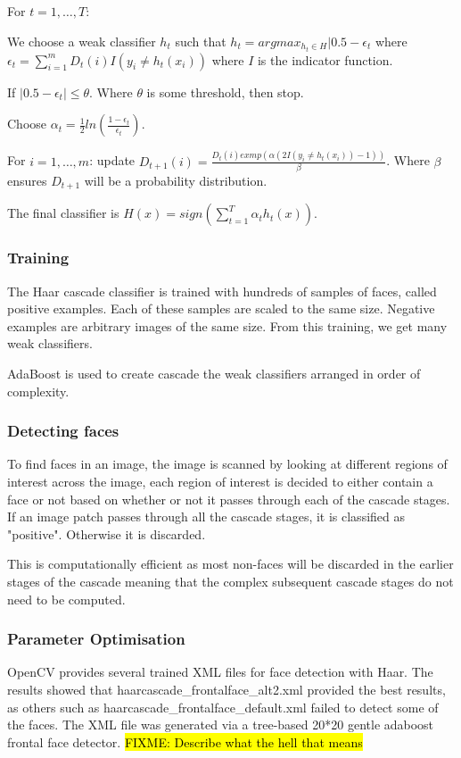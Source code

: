 \documentclass{article}
\begin{document}
\noindent For $t=1,\ldots,T$:

We choose a weak classifier $h_t$ such that $h_t = argmax_{h_t\in H}|0.5 - \epsilon_t$ where $\epsilon_t = \sum_{i=1}^m D_t(i)I(y_i\ne h_t(x_i))$ where $I$ is the indicator function.

If $|0.5 - \epsilon_t| \le \theta$. Where $\theta$ is some threshold, then stop.

Choose $\alpha_t=\frac{1}{2}ln(\frac{1-\epsilon_t}{\epsilon_t})$.

For $i=1,\ldots,m$: update $D_{t+1}(i)=\frac{D_t(i)exmp(\alpha(2I(y_i\ne h_t(x_i))-1))}{\beta}$. Where $\beta$ ensures $D_{t+1}$ will be a probability distribution.

The final classifier is $H(x)=sign(\sum_{t=1}^T\alpha_th_t(x))$.



\subsubsection{Training}
The Haar cascade classifier is trained with hundreds of samples of faces, called positive examples. Each of these samples are scaled to the same size. Negative examples are arbitrary images of the same size. From this training, we get many weak classifiers.

AdaBoost is used to create cascade the weak classifiers arranged in order of complexity.

\subsubsection{Detecting faces}
To find faces in an image, the image is scanned by looking at different regions of interest across the image, each region of interest is decided to either contain a face or not based on whether or not it passes through each of the cascade stages. If an image patch passes through all the cascade stages, it is classified as "positive". Otherwise it is discarded.

This is computationally efficient as most non-faces will be discarded in the earlier stages of the cascade meaning that the complex subsequent cascade stages do not need to be computed.

\subsubsection{Parameter Optimisation}
OpenCV provides several trained XML files for face detection with Haar. The results showed that haarcascade\_frontalface\_alt2.xml provided the best results, as others such as haarcascade\_frontalface\_default.xml failed to detect some of the faces. The XML file was generated via a tree-based 20*20 gentle adaboost frontal face detector. \hl{FIXME: Describe what the hell that means}
\end{document}
